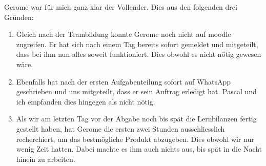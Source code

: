 Gerome war für mich ganz klar der Vollender. Dies aus den folgenden drei Gründen:
\begin{enumerate} 
\item{Gleich nach der Teambildung konnte Gerome noch nicht auf moodle zugreifen. Er hat sich nach einem Tag bereits sofort gemeldet und mitgeteilt, dass bei ihm nun alles soweit funktioniert. Dies obwohl es nicht nötig gewesen wäre.}
\item{Ebenfalls hat nach der ersten Aufgabenteilung sofort auf WhatsApp geschrieben und uns mitgeteilt, dass er sein Auftrag erledigt hat. Pascal und ich empfanden dies hingegen als nicht nötig.}
\item{Als wir am letzten Tag vor der Abgabe noch bis spät die Lernbilanzen fertig gestellt haben, hat Gerome die ersten zwei Stunden ausschliesslich recherchiert, um das bestmögliche Produkt abzugeben. Dies obwohl wir nur wenig Zeit hatten. Dabei machte es ihm auch nichts aus, bis spät in die Nacht hinein zu arbeiten.}
\end{enumerate}
